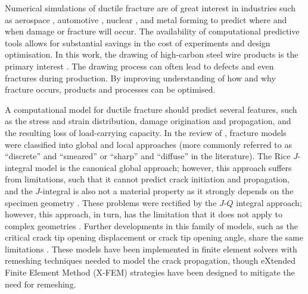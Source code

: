 \documentclass[sn-mathphys,Numbered]{sn-jnl}%
\begin{document}
Numerical simulations of ductile fracture are of great interest in industries such as aerospace \cite{riccio_damage_2015, johnson_numerical_2015}, automotive \cite{alharbi_damage_2015, sirinakorn_microstructure_2014, sarraf_mesoscale_2017, uthaisangsuk_characterisation_2009}, nuclear \cite{chen_modeling_2020}, and metal forming \cite{masse_study_2010, cao_models_2017, tekkaya_damage_2020, clancy_improving_2019, borchers_cold-drawn_2016, cardiff_lagrangian_2017} to predict where and when damage or fracture will occur.
The availability of computational predictive tools allows for substantial savings in the cost of experiments and design optimisation.
In this work, the drawing of high-carbon steel wire products is the primary interest \cite{clancy_improving_2019, borchers_cold-drawn_2016}.
The drawing process can often lead to defects and even fractures during production.
By improving understanding of how and why fracture occurs, products and processes can be optimised.

A computational model for ductile fracture should predict several features, such as the stress and strain distribution, damage origination and propagation, and the resulting loss of load-carrying capacity. %
In the review of \citet{besson_continuum_2010}, fracture models were classified into global and local approaches (more commonly referred to as “discrete” and “smeared” or “sharp” and “diffuse” in the literature).
The Rice $J$-integral model is the canonical global approach; however, this approach suffers from limitations, such that it cannot predict crack initiation and propagation, and the $J$-integral is also not a material property as it strongly depends on the specimen geometry \cite{hackett_experimental_1993}.
These problems were rectified by the $J$-$Q$ integral approach; however, this approach, in turn, has the limitation that it does not apply to complex geometries \cite{odowd_family_1991}.
Further developments in this family of models, such as the critical crack tip opening displacement or crack tip opening angle, share the same limitations \cite{james_effect_2003, mahmoud_effect_2003}.
These models have been implemented in finite element solvers with remeshing techniques needed to model the crack propagation, though eXtended Finite Element Method (X-FEM) strategies have been designed to mitigate the need for remeshing.
\end{document}

